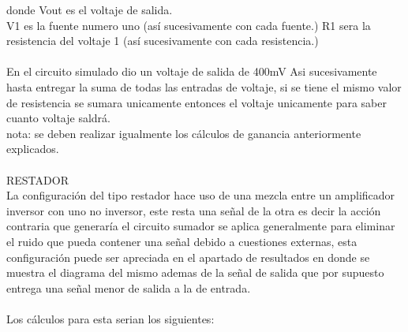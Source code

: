 \documentclass[13pt]{article}
\begin{document}
donde Vout es el voltaje de salida.\\
V1 es la fuente numero uno (así sucesivamente con cada fuente.)
R1 sera la resistencia del voltaje 1 (así sucesivamente con cada resistencia.)\\\\En el circuito simulado dio un voltaje de salida de 400mV
 Asi sucesivamente hasta entregar la suma de todas las entradas de voltaje, si se tiene el mismo valor de resistencia se sumara unicamente entonces el voltaje  unicamente para saber cuanto voltaje saldrá.\\nota: se deben realizar igualmente los cálculos de ganancia anteriormente explicados.\\\\ 
RESTADOR\\
La configuración del tipo restador hace uso de una mezcla entre un amplificador inversor con uno no inversor, este resta una señal de la otra es decir la acción contraria que generaría el circuito sumador se aplica generalmente para eliminar el ruido que pueda contener una señal debido a cuestiones externas, esta configuración puede ser apreciada en el apartado de resultados en donde se muestra el diagrama del mismo ademas de la señal de salida que por supuesto entrega una señal menor de salida a la de entrada.\\\\
Los cálculos para esta serian los siguientes:\\\\ 
\end{document}
